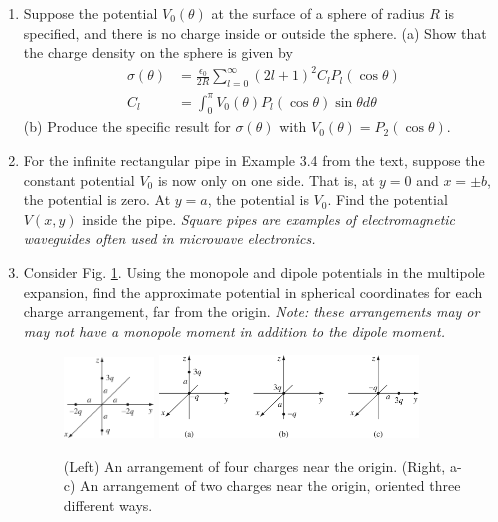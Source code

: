 \documentclass[10pt]{article}
\begin{document}
\begin{enumerate}
\item Suppose the potential $V_0(\theta)$ at the surface of a sphere of radius $R$ is specified, and there is no charge inside or outside the sphere.  (a) Show that the charge density on the sphere is given by
\begin{align}
\sigma(\theta) &= \frac{\epsilon_0}{2R} \sum_{l=0}^{\infty} (2l+1)^2 C_l P_l(\cos\theta) \\
C_l &= \int_0^{\pi} V_0(\theta) P_l (\cos\theta) \sin\theta d\theta
\end{align}
(b) Produce the specific result for $\sigma(\theta)$ with $V_0(\theta) = P_2(\cos\theta)$. \\ \vspace{4cm}
\item For the infinite rectangular pipe in Example 3.4 from the text, suppose the constant potential $V_0$ is now only on one side.  That is, at $y=0$ and $x=\pm b$, the potential is zero.  At $y=a$, the potential is $V_0$.  Find the potential $V(x,y)$ inside the pipe.  \textit{Square pipes are examples of electromagnetic waveguides often used in microwave electronics.} \\ \vspace{4cm}
\item Consider Fig. \ref{fig:dipoles}.  Using the monopole and dipole potentials in the multipole expansion, find the approximate potential in spherical coordinates for each charge arrangement, far from the origin.  \textit{Note: these arrangements may or may not have a monopole moment in addition to the dipole moment.}
\begin{figure}
\centering
\includegraphics[width=0.225\textwidth]{figures/3_31.jpg} \hspace{1cm}
\includegraphics[width=0.65\textwidth]{figures/3_35.jpg}
\caption{\label{fig:dipoles} (Left) An arrangement of four charges near the origin.  (Right, a-c) An arrangement of two charges near the origin, oriented three different ways.}
\end{figure}
\end{enumerate}
\end{document}
